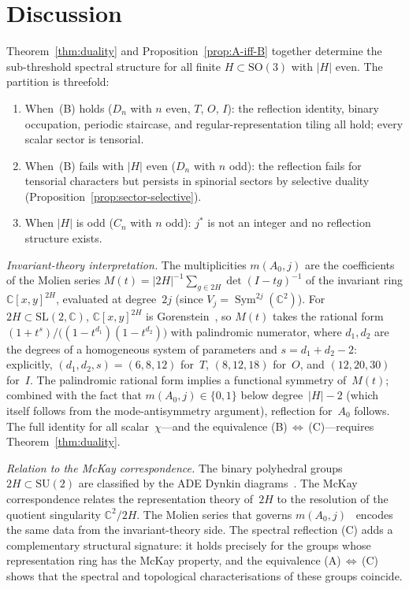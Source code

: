 \documentclass[12pt]{article}
\theoremstyle{definition}
\theoremstyle{remark}
\newcommand{\CC}{\mathbb{C}}
\newcommand{\SU}{\mathrm{SU}}
\newcommand{\SO}{\mathrm{SO}}
\DeclareMathOperator{\Sym}{Sym}
\newcommand{\SL}{\mathrm{SL}}
\begin{document}
\section{Discussion}
\label{sec:discussion}

Theorem~\ref{thm:duality} and Proposition~\ref{prop:A-iff-B}
together determine the sub-threshold spectral structure
for all finite $H \subset \SO(3)$ with $|H|$ even.
The partition is threefold:
\begin{enumerate}
\item[(i)] When~(B) holds ($D_n$ with $n$ even, $T$, $O$, $I$):
  the reflection identity, binary occupation, periodic
  staircase, and regular-representation tiling all hold;
  every scalar sector is tensorial.
\item[(ii)] When~(B) fails with $|H|$ even ($D_n$ with
  $n$ odd): the reflection fails for tensorial characters
  but persists in spinorial sectors by selective duality
  (Proposition~\ref{prop:sector-selective}).
\item[(iii)] When $|H|$ is odd ($C_n$ with $n$ odd):
  $j^*$ is not an integer and no reflection structure exists.
\end{enumerate}

\emph{Invariant-theory interpretation.}
The multiplicities $m(A_0, j)$ are the
coefficients of the Molien series
$M(t) = |2H|^{-1} \sum_{g \in 2H} \det(I - tg)^{-1}$
of the invariant ring $\CC[x,y]^{2H}$, evaluated at
degree~$2j$ (since $V_j = \Sym^{2j}(\CC^2)$).
For $2H \subset \SL(2,\CC)$,
$\CC[x,y]^{2H}$ is Gorenstein~\cite{Watanabe1974},
so $M(t)$ takes the rational form
$(1 + t^s)/\bigl((1-t^{d_1})(1-t^{d_2})\bigr)$
with palindromic numerator,
where $d_1, d_2$ are the degrees of a homogeneous system
of parameters and $s = d_1 + d_2 - 2$:
explicitly, $(d_1,d_2,s) = (6,8,12)$ for~$T$,
$(8,12,18)$ for~$O$, and $(12,20,30)$ for~$I$.
The palindromic rational form implies a functional symmetry
of~$M(t)$; combined with the fact that $m(A_0, j) \in \{0,1\}$
below degree~$|H| - 2$ (which itself follows from the
mode-antisymmetry argument), reflection for~$A_0$ follows.
The full identity for all scalar~$\chi$---and the equivalence
(B)$\,\Leftrightarrow\,$(C)---requires
Theorem~\ref{thm:duality}.

\emph{Relation to the McKay correspondence.}
The binary polyhedral groups $2H \subset \SU(2)$
are classified by the ADE Dynkin
diagrams~\cite{McKay1980,Reid2002}.
The McKay correspondence relates the representation
theory of~$2H$ to the resolution of the quotient
singularity $\CC^2/2H$.
The Molien series that governs
$m(A_0, j)$~\cite{Stanley1979} encodes the same data
from the invariant-theory side.
The spectral reflection (C) adds a complementary
structural signature: it holds precisely for the
groups whose representation ring has the McKay property,
and the equivalence (A)$\,\Leftrightarrow\,$(C)
shows that the spectral and topological characterisations
of these groups coincide.
\end{document}
